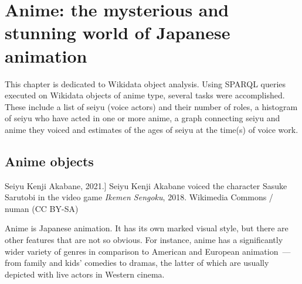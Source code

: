 
\chapter{Anime: the mysterious and stunning world of Japanese animation\protect\footnotemark}




This chapter is dedicated to  Wikidata object analysis. Using SPARQL queries executed on Wikidata objects of anime type, several tasks were accomplished. These include a list of seiyu (voice actors) and their number of roles, a histogram of seiyu who have acted in one or more anime, a graph connecting seiyu and anime they voiced and estimates of the ages of seiyu at the time(s) of voice work.

\section{Anime objects}

\begin{marginfigure}[0.0cm]
{
	\setlength{\fboxsep}{0pt}%
	\setlength{\fboxrule}{1pt}%
}
\caption
[Seiyu Kenji Akabane, 2021.]
{
Seiyu Kenji Akabane voiced the character Sasuke Sarutobi in the video game \emph{Ikemen Sengoku}, 2018.\newline
Wikimedia Commons / numan (CC BY-SA)
}
\label{fig:seiyu}
\end{marginfigure}

Anime is Japanese animation. It has its own marked visual style, but there are other features that are not so obvious. For instance, anime has a significantly wider variety of genres in comparison to American and European animation~--- from family and kids' comedies to dramas, the latter of which are usually depicted with live actors in Western cinema.

